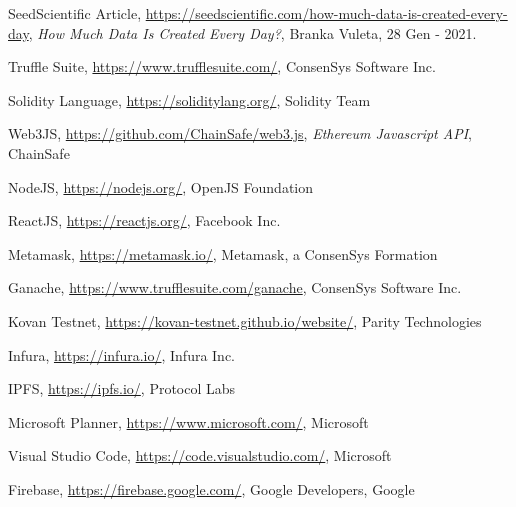 \documentclass{article}
\begin{document}
\newpage
{}
\begin{thebibliography}{1}

SeedScientific Article, \href{https://seedscientific.com/how-much-data-is-created-every-day}{https://seedscientific.com/how-much-data-is-created-every-day},
\textit{How Much Data Is Created Every Day?}, Branka Vuleta, 28 Gen - 2021.

Truffle Suite, \href{https://www.trufflesuite.com/}{https://www.trufflesuite.com/}, ConsenSys Software Inc.

Solidity Language, \href{https://soliditylang.org/}{https://soliditylang.org/}, Solidity Team

Web3JS, \href{https://github.com/ChainSafe/web3.js}{https://github.com/ChainSafe/web3.js}, \textit{Ethereum Javascript API}, ChainSafe

NodeJS, \href{https://nodejs.org/}{https://nodejs.org/}, OpenJS Foundation

ReactJS, \href{https://reactjs.org/}{https://reactjs.org/}, Facebook Inc.

Metamask, \href{https://metamask.io/}{https://metamask.io/}, Metamask, a ConsenSys Formation

Ganache, \href{https://www.trufflesuite.com/ganache}{https://www.trufflesuite.com/ganache}, ConsenSys Software Inc.

Kovan Testnet, \href{https://kovan-testnet.github.io/website/}{https://kovan-testnet.github.io/website/}, Parity Technologies

Infura, \href{https://infura.io/}{https://infura.io/}, Infura Inc.

IPFS, \href{https://ipfs.io/}{https://ipfs.io/}, Protocol Labs

Microsoft Planner, \href{https://www.microsoft.com/en-ww/microsoft-365/business/task-management-software}{https://www.microsoft.com/}, Microsoft

Visual Studio Code, \href{https://code.visualstudio.com/}{https://code.visualstudio.com/}, Microsoft

Firebase, \href{https://firebase.google.com/}{https://firebase.google.com/}, Google Developers, Google


\end{thebibliography}
\end{document}
